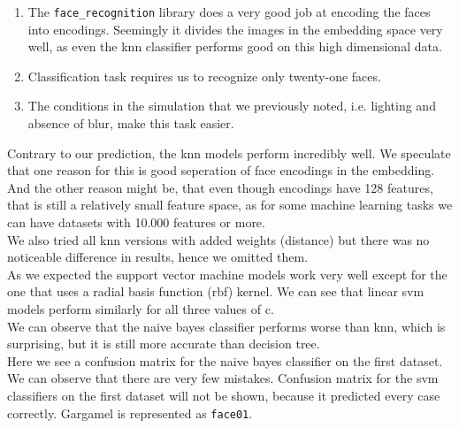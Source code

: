 \documentclass[12pt,a4paper]{article}
\begin{document}
    \begin{enumerate}
      \item The \texttt{face\_recognition} library does a very good job at encoding the faces into encodings. Seemingly it divides the images in the embedding space very well, as even the knn classifier performs good on this high dimensional data.
      \item Classification task requires us to recognize only twenty-one faces.
      \item The conditions in the simulation that we previously noted, i.e. lighting and absence of blur, make this task easier.
    \end{enumerate}

    Contrary to our prediction, the knn models perform incredibly well. We speculate that one reason for this is good seperation of face encodings in the embedding. And the other reason might be, that even though encodings have 128 features, that is still a relatively small feature space, as for some machine learning tasks we can have datasets with 10.000 features or more. \\

    We also tried all knn versions with added weights (distance) but there was no noticeable difference in results, hence we omitted them. \\

    As we expected the support vector machine models work very well except for the one that uses a radial basis function (rbf) kernel. We can see that linear svm models perform similarly for all three values of c. \\

    We can observe that the naive bayes classifier performs worse than knn, which is surprising, but it is still more accurate than decision tree. \\

    Here we see a confusion matrix for the naive bayes classifier on the first dataset. We can observe that there are very few mistakes. Confusion matrix for the svm classifiers on the first dataset will not be shown, because it predicted every case correctly. Gargamel is represented as \texttt{face01}.
    
\end{document}
